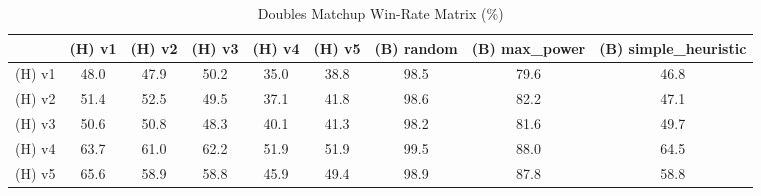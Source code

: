 \begin{table}[htbp]
\caption{Doubles Matchup Win-Rate Matrix (\%)}
\label{tab:doubles_win_rate_gen8}
\begin{tabular}{lcccccccc}
\hline
 & (H) v1 & (H) v2 & (H) v3 & (H) v4 & (H) v5 & (B) random & (B) max\_power & (B) simple\_heuristic \\
\hline
(H) v1 & 48.0 & 47.9 & 50.2 & 35.0 & 38.8 & 98.5 & 79.6 & 46.8 \\
(H) v2 & 51.4 & 52.5 & 49.5 & 37.1 & 41.8 & 98.6 & 82.2 & 47.1 \\
(H) v3 & 50.6 & 50.8 & 48.3 & 40.1 & 41.3 & 98.2 & 81.6 & 49.7 \\
(H) v4 & 63.7 & 61.0 & 62.2 & 51.9 & 51.9 & 99.5 & 88.0 & 64.5 \\
(H) v5 & 65.6 & 58.9 & 58.8 & 45.9 & 49.4 & 98.9 & 87.8 & 58.8 \\
\hline
\end{tabular}
\end{table}

